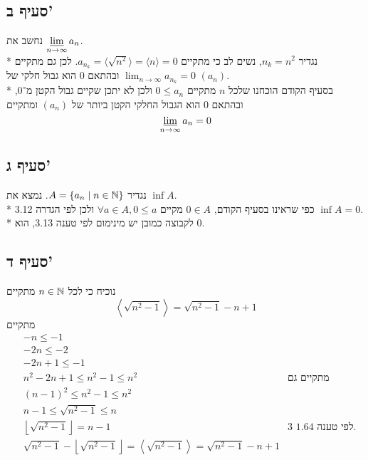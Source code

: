 \subsection{סעיף ב'}
נחשב את $\displaystyle\operatorname*{\underline{lim}}_{n \to \infty} a_n$. \\*
נגדיר $n_k = n^2$, נשים לב כי מתקיים $a_{n_k} = \langle \sqrt{n^2} \rangle = \langle n \rangle = 0$.
לכן גם מתקיים $\lim_{n \to \infty} a_{n_k} = 0$ ובהתאם 0 הוא גבול חלקי של $(a_n)$. \\*
בסעיף הקודם הוכחנו שלכל $n$ מתקיים $0 \le a_n$ ולכן לא יתכן שקיים גבול הקטן מ־0, ובהתאם 0 הוא הגבול החלקי הקטן ביותר של $(a_n)$ ומתקיים
\[
	\operatorname*{\underline{lim}}_{n \to \infty} a_n = 0
\]

\subsection{סעיף ג'}
נגדיר $A = \{ a_n \mid n \in \mathbb{N} \}$. נמצא את $\inf A$. \\*
כפי שראינו בסעיף הקודם, $0 \in A$ מקיים $\forall a \in A, 0 \le a$ ולכן לפי הגדרה 3.12 $\inf A = 0$. \\*
לקבוצה כמובן יש מינימום לפי טענה 3.13, הוא $0$.

\subsection{סעיף ד'}
נוכיח כי לכל $n \in \mathbb{N}$ מתקיים
\[
	\left\langle \sqrt{n^2 - 1} \right\rangle = \sqrt{n^2 - 1} - n + 1
\]
מתקיים
\begin{align*}
	& -n \le -1 \\
	& -2n \le -2 \\
	& -2n + 1 \le -1 \\
	& n^2 - 2n + 1 \le n^2 - 1 \le n^2 & \text{מתקיים גם} \\
	& (n - 1)^2 \le n^2 - 1 \le n^2 \\
	& n - 1 \le \sqrt{n^2 - 1} \le n \\
	& \left\lfloor \sqrt{n^2 - 1} \right\rfloor = n - 1 & \text{לפי טענה 1.64 3.} \\
	& \sqrt{n^2 - 1} - \left\lfloor \sqrt{n^2 - 1} \right\rfloor = \left\langle \sqrt{n^2 - 1} \right\rangle = \sqrt{n^2 - 1} - n + 1
\end{align*}

